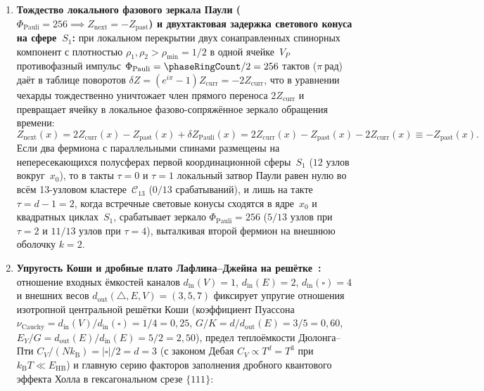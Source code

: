 \begin{theorem}[Строго локальный пороговый затвор--Ньютона $81 = d^4$, локальное зеркало Паули $Z_{\mathrm{next}} = -Z_{\mathrm{past}}$ и задержки светового конуса]
\begin{enumerate}[leftmargin=*]
  При этом синхронизация двух узлов по общему начальному вектору $\mathrm{IV}$ из их общего прошлого светового конуса позволяет им предвычислять детерминированную эволюцию траекторий $(x,\Delta Z)$ внутри мёртвой зоны в режиме разделённого потокового ключа на~$\Mlayer$ без возмущения состояния, тогда как передача любого нового бита сообщения от отправителя к приёмнику требует внесения надпорогового импульса $|\Phi_{\mathrm{raw}}| \ge 41$, распространяющегося по решётке~\latGCKshort\ со скоростью светового конуса $c_0 = 1$ шаг за такт в строгом согласии с релятивистской причинностью.
\item \textbf{Тождество локального фазового зеркала Паули ($\Phi_{\mathrm{Pauli}} = 256 \implies Z_{\mathrm{next}} = -Z_{\mathrm{past}}$) и двухтактовая задержка светового конуса на сфере~$S_1$:}
  при локальном перекрытии двух сонаправленных спинорных компонент с плотностью $\rho_1,\rho_2 > \rho_{\min} = 1/2$ в одной ячейке~$V_P$ противофазный импульс $\Phi_{\mathrm{Pauli}} = \phaseRingCount/2 = 256$ тактов ($\pi\ \text{рад}$) даёт в таблице поворотов $\delta Z = (e^{i\pi} - 1)Z_{\mathrm{curr}} = -2Z_{\mathrm{curr}}$, что в уравнении чехарды тождественно уничтожает член прямого переноса $2Z_{\mathrm{curr}}$ и превращает ячейку в локальное фазово-сопряжённое зеркало обращения времени:
  \begin{equation}
  \label{eq:compute-pauli-local-mirror}
    Z_{\mathrm{next}}(x) = 2Z_{\mathrm{curr}}(x) - Z_{\mathrm{past}}(x) + \delta Z_{\mathrm{Pauli}}(x)
    = 2Z_{\mathrm{curr}}(x) - Z_{\mathrm{past}}(x) - 2Z_{\mathrm{curr}}(x) \equiv -Z_{\mathrm{past}}(x).
  \end{equation}
  Если два фермиона с параллельными спинами размещены на непересекающихся полусферах первой координационной сферы~$S_1$ ($12$ узлов вокруг~$x_0$), то в такты $\tau = 0$ и $\tau = 1$ локальный затвор Паули равен нулю во всём 13-узловом кластере~$\mathcal{C}_{13}$ ($0/13$ срабатываний), и лишь на такте $\tau = d - 1 = 2$, когда встречные световые конусы сходятся в ядре~$x_0$ и квадратных циклах~$S_1$, срабатывает зеркало $\Phi_{\mathrm{Pauli}} = 256$ ($5/13$ узлов при $\tau=2$ и $11/13$ узлов при $\tau=4$), выталкивая второй фермион на внешнюю оболочку $k = 2$.
\item \textbf{Упругость Коши и дробные плато Лафлина--Джейна на решётке~\latGCKshort:}
  отношение входных ёмкостей каналов $d_{\mathrm{in}}(V)=1$, $d_{\mathrm{in}}(E)=2$, $d_{\mathrm{in}}(\square)=4$ и внешних весов $d_{\mathrm{out}}(\triangle,E,V) = (3,5,7)$ фиксирует упругие отношения изотропной центральной решётки Коши (коэффициент Пуассона $\nu_{\mathrm{Cauchy}} = d_{\mathrm{in}}(V)/d_{\mathrm{in}}(\square) = 1/4 = 0{,}25$, $G/K = d/d_{\mathrm{out}}(E) = 3/5 = 0{,}60$, $E_Y/G = d_{\mathrm{out}}(E)/d_{\mathrm{in}}(E) = 5/2 = 2{,}50$), предел теплоёмкости Дюлонга--Пти $C_V/(Nk_{\mathrm{B}}) = |\square|/2 = d = 3$ (с законом Дебая $C_V\propto T^d = T^3$ при $k_{\mathrm{B}}T \ll E_{\mathrm{HB}}$) и главную серию факторов заполнения дробного квантового эффекта Холла в гексагональном срезе $\{111\}$:

\end{enumerate}
\end{theorem}
